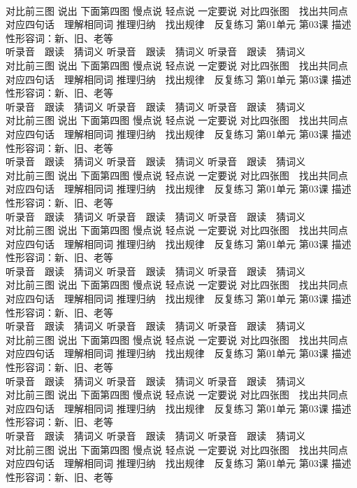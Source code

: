 \documentclass[8pt]{extreport}
\begin{document}
\begin{CJK}{UTF8}{min}
\\	对比前三图 说出 下面第四图 慢点说 轻点说 一定要说	对比四张图　找出共同点 对应四句话　理解相同词 推理归纳　找出规律　反复练习 第01单元 第03课 描述性形容词：新、旧、老等
\\	听录音　跟读　猜词义 听录音　跟读　猜词义 听录音　跟读　猜词义 
\\	对比前三图 说出 下面第四图 慢点说 轻点说 一定要说	对比四张图　找出共同点 对应四句话　理解相同词 推理归纳　找出规律　反复练习 第01单元 第03课 描述性形容词：新、旧、老等
\\	听录音　跟读　猜词义 听录音　跟读　猜词义 听录音　跟读　猜词义 
\\	对比前三图 说出 下面第四图 慢点说 轻点说 一定要说	对比四张图　找出共同点 对应四句话　理解相同词 推理归纳　找出规律　反复练习 第01单元 第03课 描述性形容词：新、旧、老等
\\	听录音　跟读　猜词义 听录音　跟读　猜词义 听录音　跟读　猜词义 
\\	对比前三图 说出 下面第四图 慢点说 轻点说 一定要说	对比四张图　找出共同点 对应四句话　理解相同词 推理归纳　找出规律　反复练习 第01单元 第03课 描述性形容词：新、旧、老等
\\	听录音　跟读　猜词义 听录音　跟读　猜词义 听录音　跟读　猜词义 
\\	对比前三图 说出 下面第四图 慢点说 轻点说 一定要说	对比四张图　找出共同点 对应四句话　理解相同词 推理归纳　找出规律　反复练习 第01单元 第03课 描述性形容词：新、旧、老等
\\	听录音　跟读　猜词义 听录音　跟读　猜词义 听录音　跟读　猜词义 
\\	对比前三图 说出 下面第四图 慢点说 轻点说 一定要说	对比四张图　找出共同点 对应四句话　理解相同词 推理归纳　找出规律　反复练习 第01单元 第03课 描述性形容词：新、旧、老等
\\	听录音　跟读　猜词义 听录音　跟读　猜词义 听录音　跟读　猜词义 
\\	对比前三图 说出 下面第四图 慢点说 轻点说 一定要说	对比四张图　找出共同点 对应四句话　理解相同词 推理归纳　找出规律　反复练习 第01单元 第03课 描述性形容词：新、旧、老等
\\	听录音　跟读　猜词义 听录音　跟读　猜词义 听录音　跟读　猜词义 
\\	对比前三图 说出 下面第四图 慢点说 轻点说 一定要说	对比四张图　找出共同点 对应四句话　理解相同词 推理归纳　找出规律　反复练习 第01单元 第03课 描述性形容词：新、旧、老等
\\	听录音　跟读　猜词义 听录音　跟读　猜词义 听录音　跟读　猜词义 
\\	对比前三图 说出 下面第四图 慢点说 轻点说 一定要说	对比四张图　找出共同点 对应四句话　理解相同词 推理归纳　找出规律　反复练习 第01单元 第03课 描述性形容词：新、旧、老等

\end{CJK}
\end{document}
